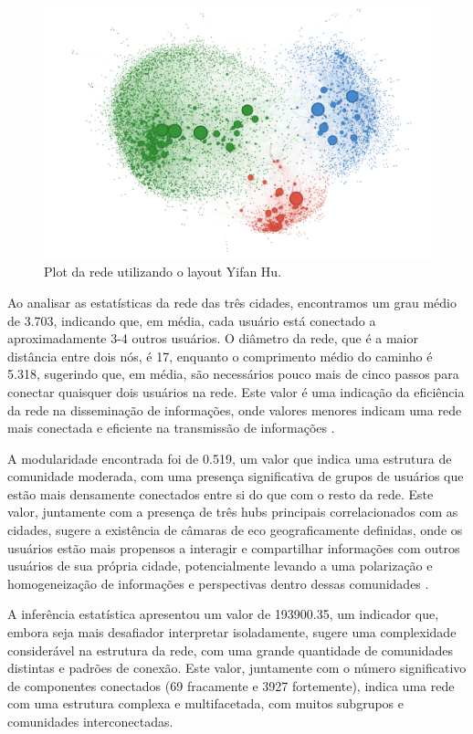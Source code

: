 \begin{figure}[!htb]
	\caption{Plot da rede utilizando o layout Yifan Hu.}
	\label{fig:colab_graph_3_cidades_yifan }
	\centering
	\includegraphics[scale=0.45]{images/colab_graph_3_cidades_yifan.png}
	\fautor
\end{figure}

Ao analisar as estatísticas da rede das três cidades, encontramos um grau médio de 3.703, indicando que, em média, cada usuário está conectado a aproximadamente 3-4 outros usuários. O diâmetro da rede, que é a maior distância entre dois nós, é 17, enquanto o comprimento médio do caminho é 5.318, sugerindo que, em média, são necessários pouco mais de cinco passos para conectar quaisquer dois usuários na rede. Este valor é uma indicação da eficiência da rede na disseminação de informações, onde valores menores indicam uma rede mais conectada e eficiente na transmissão de informações \cite{2010_Newman_BOOK}.

A modularidade encontrada foi de 0.519, um valor que indica uma estrutura de comunidade moderada, com uma presença significativa de grupos de usuários que estão mais densamente conectados entre si do que com o resto da rede. Este valor, juntamente com a presença de três hubs principais correlacionados com as cidades, sugere a existência de câmaras de eco geograficamente definidas, onde os usuários estão mais propensos a interagir e compartilhar informações com outros usuários de sua própria cidade, potencialmente levando a uma polarização e homogeneização de informações e perspectivas dentro dessas comunidades \cite{2010_Fortunato}.

A inferência estatística apresentou um valor de 193900.35, um indicador que, embora seja mais desafiador interpretar isoladamente, sugere uma complexidade considerável na estrutura da rede, com uma grande quantidade de comunidades distintas e padrões de conexão. Este valor, juntamente com o número significativo de componentes conectados (69 fracamente e 3927 fortemente), indica uma rede com uma estrutura complexa e multifacetada, com muitos subgrupos e comunidades interconectadas.

